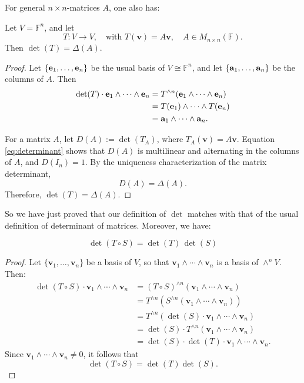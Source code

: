 For general $n \times n$-matrices $A$, one also has:
\begin{theorem}\label{thm:det_linear_operator_matrix}
Let \( V = \mathbb{F}^n \), and let
\[
T : V \to V, \quad \text{with } T(\mathbf{v}) = A \mathbf{v}, \quad A \in M_{n \times n}(\mathbb{F}).
\]
Then \(\det(T) = \Delta(A).\)
\end{theorem}
\begin{proof}
Let \( \{ {\bf e}_1, \dots, {\bf e}_n \} \) be the usual basis of \( V \cong \mathbb{F}^n \), and let \( \{ {\bf a}_1, \dots, {\bf a}_n \} \) be the columns of $A$. Then
\begin{equation} \label{eq:determinant}
\begin{aligned}
\det(T) \cdot {\bf e}_1 \wedge \cdots \wedge {\bf e}_n
  &= T^{\wedge n}({\bf e}_1 \wedge \cdots \wedge {\bf e}_n) \\
  &= T({\bf e}_1) \wedge \cdots \wedge T({\bf e}_n) \\
  &= {\bf a}_1 \wedge \cdots \wedge {\bf a}_n.
\end{aligned}
\end{equation}

For a matrix $A$, let $D(A):=\det(T_A)$, where $T_A(\mathbf v)=A\mathbf v$. Equation \eqref{eq:determinant} shows that $D(A)$ is multilinear and alternating in the columns of $A$, and $D(I_n)=1$. By the uniqueness characterization of the matrix determinant,
\[
D(A)=\Delta(A).
\]
Therefore, $\det(T)=\Delta(A)$.
\end{proof}

So we have just proved that our definition of $\det$ matches with that of the usual definition of determinant of matrices. Moreover, we have:
\begin{corollary}
\label{cor:det-composition}
\[
\det(T \circ S) = \det(T)\, \det(S)
\]
\end{corollary}

\begin{proof}
Let \( \{\mathbf{v}_1, \dots, \mathbf{v}_n\} \) be a basis of \( V \), so that \( \mathbf{v}_1 \wedge \cdots \wedge \mathbf{v}_n \) is a basis of \( \wedge^n V \). Then:
\begin{align*}
\det(T \circ S) \cdot \mathbf{v}_1 \wedge \cdots \wedge \mathbf{v}_n 
  &= (T \circ S)^{\wedge n} (\mathbf{v}_1 \wedge \cdots \wedge \mathbf{v}_n) \\
  &= T^{\wedge n} \left( S^{\wedge n}(\mathbf{v}_1 \wedge \cdots \wedge \mathbf{v}_n) \right) \\
  &= T^{\wedge n} \left( \det(S) \cdot \mathbf{v}_1 \wedge \cdots \wedge \mathbf{v}_n \right) \\
  &= \det(S) \cdot T^{\wedge n}(\mathbf{v}_1 \wedge \cdots \wedge \mathbf{v}_n) \\
  &= \det(S) \cdot \det(T) \cdot \mathbf{v}_1 \wedge \cdots \wedge \mathbf{v}_n.
\end{align*}
Since \( \mathbf{v}_1 \wedge \cdots \wedge \mathbf{v}_n \neq 0 \), it follows that
\[
\det(T \circ S) = \det(T)\det(S).
\]
\end{proof}



